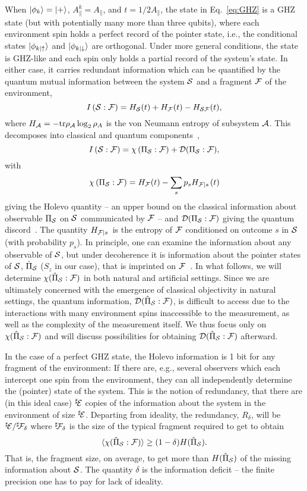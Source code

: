\documentclass[aps,prl,floatfix,twocolumn,footinbib,superscriptaddress]{revtex4-1}
\begin{document}
When $\ket{\phi_k} = \ket{+}$, $A^k_\parallel=A_\parallel$, and $t=1/2A_\parallel$, the state in Eq.~\eqref{eq:GHZ} is a GHZ state (but with potentially many more than three qubits), where each environment spin holds a perfect record of the pointer state, i.e., the conditional states $\ket{\phi_{k|\up}}$ and $\ket{\phi_{k|\down}}$ are orthogonal. Under more general conditions, the state is GHZ-like and each spin only holds a partial record of the system's state. In either case, it carries redundant information which can be quantified by the quantum mutual information between the system $\S$ and a fragment $\F$ of the environment, 
\begin{equation} \label{eq:MI}
\MI = \ES + \EF - \ESF ,
\end{equation}
where $H_\A=-\tr \rho_\A \log_2 \rho_A$ is the von Neumann entropy of subsystem $\A$. This decomposes into classical and quantum components~\cite{Zwolak13-1}, 
\begin{equation} \label{eq:QC}
\MI = \Hol + \QD ,
\end{equation}
with
\begin{equation}
\Hol = \EF - \sum_{s} p_s \CEF(t)
\end{equation}
giving the Holevo quantity -- an upper bound on the classical information about observable $\Pi_{\S}$ on $\S$ communicated by $\F$ -- and $\QD$ giving the quantum discord~\cite{Zurek00-1,Ollivier02-1,Henderson01-1}. The quantity $\CEF$ is the entropy of $\F$ conditioned on outcome $s$ in $\S$ (with probability $p_s$). In principle, one can examine the information about any observable of $\S$, but under decoherence it is information about the pointer states of $\S$, $\PO$ ($S_z$ in our case), that is imprinted on $\F$~\cite{Ollivier04-1,Zwolak13-1}. In what follows, we will determine $\HolpIL$ in both natural and artificial settings. Since we are ultimately concerned with the emergence of classical objectivity in natural settings, the quantum information, $\QDpIL$, is difficult to access due to the interactions with many environment spins inaccessible to the measurement, as well as the complexity of the measurement itself. We thus focus only on $\HolpIL$ and will discuss possibilities for obtaining $\QDpIL$ afterward.

In the case of a perfect GHZ state, the Holevo information is 1 bit for any fragment of the environment: If there are, e.g., several observers which each intercept one spin from the environment, they can all independently determine the (pointer) state of the system. This is the notion of redundancy, that there are (in this ideal case) $\Es$ copies of the information about the system in the environment of size $\Es$. Departing from ideality, the redundancy, $R_\delta$, will be $\Es/\Fd$ where $\Fd$ is the size of the typical fragment required to get to obtain
\begin{equation} \label{eq:Red}
\avg{\HolpIL} \ge (1-\delta) \HPB .
\end{equation}
That is, the fragment size, on average, to get more than $\HPB$ of the missing information about $\S$. The quantity $\delta$ is the information deficit -- the finite precision one has to pay for lack of ideality. 
\end{document}
